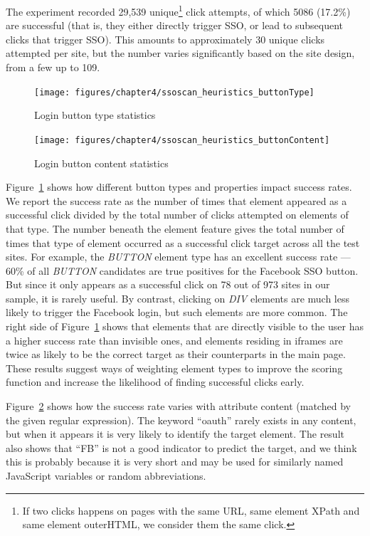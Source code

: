 The experiment recorded 29,539 unique\footnote{If two clicks happens on pages with the same URL, same element XPath and same element outerHTML, we consider them the same click.} click attempts, of which 5086 (17.2\%) are successful (that is, they either directly trigger SSO, or lead to subsequent clicks that trigger SSO).  This amounts to approximately 30 unique clicks attempted per site, but the number varies significantly based on the site design, from a few up to 109.

\begin{figure}[htb]
\centering
\texttt{[image: figures/chapter4/ssoscan\_heuristics\_buttonType]}
\caption{Login button type statistics}
\label{fig:ssoscan_heuristics_buttonType}
\end{figure}

\begin{figure}[htb]
\centering
\texttt{[image: figures/chapter4/ssoscan\_heuristics\_buttonContent]}
\caption{Login button content statistics}
\label{fig:ssoscan_heuristics_buttonContent}
\end{figure}

 Figure~\ref{fig:ssoscan_heuristics_buttonType} shows how different button types and properties impact success rates.  We report the success rate as the number of times that element appeared as a successful click divided by the total number of clicks attempted on elements of that type.  The number beneath the element feature gives the total number of times that type of element occurred as a successful click target across all the test sites.  For example, the \emph{BUTTON} element type has an excellent success rate --- 60\% of all \emph{BUTTON} candidates are true positives for the Facebook SSO button.  But since it only appears as a successful click on 78 out of 973 sites in our sample, it is rarely useful.  By contrast, clicking on \emph{DIV} elements are much less likely to trigger the Facebook login, but such elements are more common.  The right side of Figure~\ref{fig:ssoscan_heuristics_buttonType} shows that elements that are directly visible to the user has a higher success rate than invisible ones, and elements residing in iframes are twice as likely to be the correct target as their counterparts in the main page.  These results suggest ways of weighting element types to improve the scoring function and increase the likelihood of finding successful clicks early.

Figure~\ref{fig:ssoscan_heuristics_buttonContent} shows how the success rate varies with attribute content (matched by the given regular expression).  The keyword ``oauth'' rarely exists in any content, but when it appears it is very likely to identify the target element.  The result also shows that ``FB'' is not a good indicator to predict the target, and we think this is probably because it is very short and may be used for similarly named JavaScript variables or random abbreviations.

